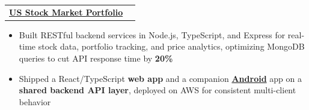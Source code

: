 \documentclass[10pt, letterpaper]{article}
\newenvironment{highlights}{
    \begin{itemize}[
        topsep=0.06 cm,
        parsep=0.06 cm,
        partopsep=0pt,
        itemsep=0pt,
        leftmargin=0 cm + 10pt
    ]
}{
    \end{itemize}
}
\newenvironment{onecolentry}{
    \par\noindent
}{
    \par
}
\begin{document}

\begin{tabularx}{\textwidth}{@{}Xr@{}}
    \href{https://usstock-git-main-animesh-srivastavas-projects-215ba52f.vercel.app/}{\textbf{US Stock Market Portfolio}}\\
\end{tabularx}
\vspace{-4.5mm}
\begin{onecolentry}
    \begin{highlights}


        

    \item[--] Built RESTful backend services in Node.js, TypeScript, and Express for real-time stock data, portfolio tracking, and price analytics, optimizing MongoDB queries to cut API response time by \textbf{20\%}
    \item[--] Shipped a React/TypeScript \textbf{web app} and a companion \href{https://drive.google.com/drive/u/2/folders/1a4LrLwlGwCV0PFq6JoiWhEciJ8c7Cd_4}{\textbf{Android}} app on a \textbf{shared backend API layer}, deployed on AWS for consistent multi-client behavior

    \end{highlights}
\end{onecolentry}
\end{document}
